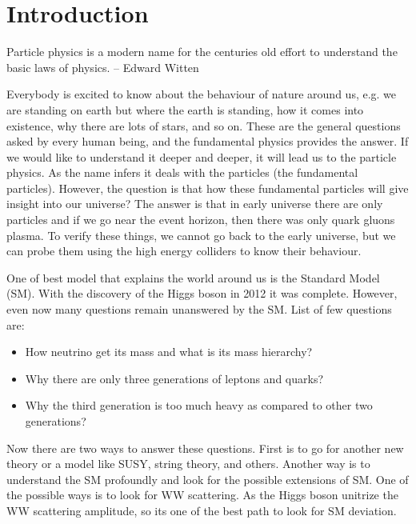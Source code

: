\chapter{Introduction}

Particle physics is a modern name for the centuries old effort to understand
the basic laws of physics. -- Edward Witten


Everybody is excited to know about the behaviour of nature around us, e.g. we are standing on earth but where the earth is standing, how it comes into existence, why there are lots of stars, and so on. These are the general questions asked by every human being, and the fundamental physics provides the answer. If we would like to understand it deeper and deeper, it will lead us to the particle physics. As the name infers it deals with the particles (the fundamental particles). However, the question is that how these fundamental particles will give insight into our universe? The answer is that in early universe there are only particles and if we go near the event horizon, then there was only quark gluons plasma. To verify these things, we cannot go back to the early universe, but we can probe them using the high energy colliders to know their behaviour.

One of best model that explains the world around us is the Standard Model (SM). With the discovery of the Higgs boson \cite{Chatrchyan:2012xdj} in 2012 it was complete. However, even now many questions remain unanswered by the SM. List of few questions are:

\begin{itemize}
\item How neutrino get its mass and what is its mass hierarchy? 
\item Why there are only three generations of leptons and quarks? 
\item Why the third generation is too much heavy as compared to other two generations?
\end{itemize}

Now there are two ways to answer these questions. First is to go for another new theory or a model like SUSY, string theory, and others. Another way is to understand the SM profoundly and look for the possible extensions of SM. One of the possible ways is to look for WW scattering. As the Higgs boson unitrize the WW scattering amplitude, so its one of the best path to look for SM deviation.

